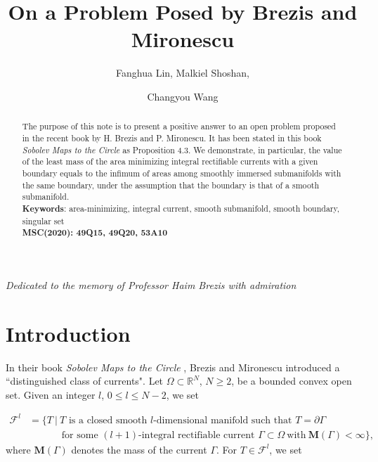 \documentclass{amsart}
\numberwithin{equation}{section}
\theoremstyle{definition}
\theoremstyle{remark}
\begin{document}
\title{On a Problem Posed by Brezis and Mironescu}
\author{Fanghua Lin, Malkiel Shoshan, }
\address{Courant Institute of Mathematical Sciences, New York University, NY 10012, USA}
\author{Changyou Wang}
\address{Department of Mathematics, Purdue University, West Lafayette, IN 47907, USA}
\begin{abstract}
The purpose of this note is to present a positive answer to an open problem proposed in the recent book \cite{Brezis-Mironescu} by H. Brezis and P. Mironescu. It has been stated in this book 
{\it Sobolev Maps to the Circle} as Proposition 4.3. We demonstrate, in particular, the value of the least mass of the area minimizing integral rectifiable currents with a given boundary equals to the infimum of areas among smoothly immersed submanifolds with the same boundary, under the assumption that the boundary is that of a smooth submanifold. \\
{\bf Keywords}: area-minimizing, integral current, smooth submanifold, smooth boundary, singular set \\
{\bf MSC(2020): 49Q15, 49Q20, 53A10}
\end{abstract}
\date{}
\maketitle
\centerline{\it Dedicated to the memory of Professor Haim Brezis with admiration}

\section{Introduction}
In {their book} \textit{Sobolev Maps to the Circle} \cite[Section 4.2]{Brezis-Mironescu}, 
Brezis  and Mironescu 
introduced a ``distinguished class of currents". Let $\Omega \subset \mathbb{R}^N$, $N \geq 2$, be 
a bounded convex open set. Given an integer $l$, $0 \leq l \leq N-2$, we set

\begin{align*}\mathcal{F}^l &= \Big\{T \ \Big|\ T \mbox{ is a closed smooth $l$-dimensional manifold such that } 
 T= \partial \Gamma\\
 &\qquad\quad\text{ for some } (l+1)\text{-integral rectifiable current } \Gamma \subset\Omega
 \ \text{with}\  \mathbf{M}(\Gamma)<\infty \Big\},
 \end{align*}
 {where $\mathbf{M}(\Gamma)$ denotes the mass of the current $\Gamma$}.
For $T \in \mathcal{F}^l$, we set
\end{document}

